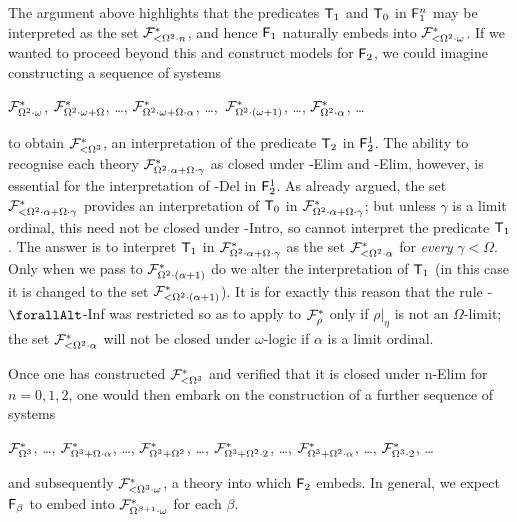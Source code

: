\documentclass[UKenglish,cleveref,DIV=12]{scrartcl}
\let\forall\forallAlt
\theoremstyle{definition}
\theoremstyle{definition}
\begin{document}
The argument above highlights that the predicates $\mathsf{T}_1$ and $\mathsf{T}_0$ in $\mathsf{F}_1^n$ may be
interpreted as the set $\mathcal{F}^*_{<\Omega^2\cdot n}$, and hence $\mathsf{F}_1$ naturally
embeds into $\mathcal{F}^*_{<\Omega^2\cdot\omega}$. If we wanted to proceed beyond this
and construct models for $\mathsf{F}_2$, we could imagine constructing a sequence of
systems
\begin{center}
  $\mathcal{F}^*_{\Omega^2\cdot\omega}$, $\mathcal{F}^*_{\Omega^2\cdot\omega+\Omega}$, \dots,
  $\mathcal{F}^*_{\Omega^2\cdot\omega+\Omega\cdot \alpha}$, \dots,\,
  $\mathcal{F}^*_{\Omega^2\cdot(\omega+1)}$, \dots,
  $\mathcal{F}^*_{\Omega^2\cdot\alpha}$, \dots%
\end{center}
to obtain $\mathcal{F}^*_{<\Omega^3}$,
an interpretation of the predicate $\mathsf{T}_2$ in $\mathsf{F}_2^1$. The ability to recognise
each theory $\mathcal{F}^*_{\Omega^2\cdot\alpha+\Omega\cdot \gamma}$ as closed under -Elim and
-Elim, however, is essential for the interpretation of -Del in
$\mathsf{F}_2^1$. As already argued, the set $\mathcal{F}^*_{<\Omega^2\cdot\alpha+\Omega\cdot \gamma}$
provides an interpretation of $\mathsf{T}_0$ in $\mathcal{F}^*_{\Omega^2\cdot\alpha+\Omega\cdot \gamma}$; but
unless $\gamma$ is a limit ordinal, this need not be closed under -Intro, so cannot
interpret the predicate $\mathsf{T}_1$. The answer is to interpret $\mathsf{T}_1$ in
$\mathcal{F}^*_{\Omega^2\cdot\alpha+\Omega\cdot \gamma}$ as the set
$\mathcal{F}^*_{<\Omega^2\cdot\alpha}$ for {\em every} $\gamma<\Omega$. Only when we
pass to $\mathcal{F}^*_{\Omega^2\cdot(\alpha+1)}$ do we alter the
interpretation of $\mathsf{T}_1$ (in this case it is changed to the set
$\mathcal{F}^*_{<\Omega^2\cdot(\alpha+1)}$). It is for exactly this reason that the rule
\textT\eta-$\forall$-Inf was restricted so as to apply to $\mathcal{F}^*_\rho$ only if
$\rho|_\eta$ is not an $\Omega$-limit; the set $\mathcal{F}^*_{<\Omega^2\cdot\alpha}$ will
not be closed under $\omega$-logic if $\alpha$ is a limit ordinal.

Once one has constructed $\mathcal{F}^*_{<\Omega^3}$ and verified that it is closed
under \textT n-Elim for $n=0,1,2$, one would then embark on the construction of
a further sequence of systems
\begin{center}
$\mathcal{F}^*_{\Omega^3}$,  \dots, %
$\mathcal{F}^*_{\Omega^3+\Omega\cdot \alpha}$, \dots, %
$\mathcal{F}^*_{\Omega^3+\Omega^2}$, \dots, $\mathcal{F}^*_{\Omega^3+\Omega^2\cdot2}$, \dots,
$\mathcal{F}^*_{\Omega^3+\Omega^2\cdot\alpha}$, \dots, $\mathcal{F}^*_{\Omega^3\cdot2}$, \dots
\end{center}
and subsequently $\mathcal{F}^*_{<\Omega^3\cdot\omega}$, a theory into which $\mathsf{F}_2$ embeds.
%
In general, we expect $\mathsf{F}_\beta$ to embed into $\mathcal{F}^*_{\Omega^{\beta+1}\cdot\omega}$ for each $\beta$.
\end{document}
